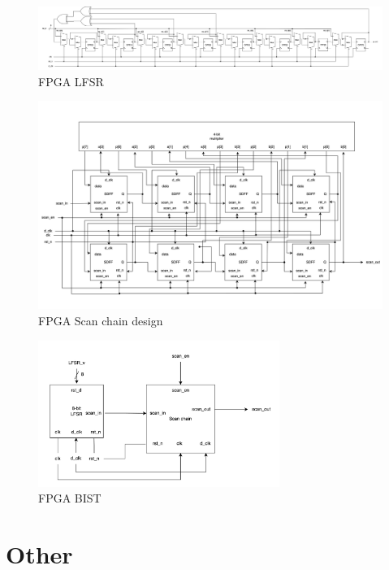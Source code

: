 \documentclass[10.5pt,compsoc,UTF8]{CjC}
\theoremstyle{mystyle}
\begin{document}
\begin{figure}[h!]
  \centering
  \includegraphics[width=\textwidth]{./img/FPGA-LFSR.png}
  \caption{FPGA LFSR}
  \label{fig:Q4-LFSR}
\end{figure}

\newpage

\begin{figure}[h!]
  \centering
  \includegraphics[width=\textwidth]{./img/FPGA-SCD.png}
  \caption{FPGA Scan chain design}
  \label{fig:Q4-SCD}
\end{figure}

\begin{figure}[h!]
  \centering
  \includegraphics[width=0.7\textwidth]{./img/FPGA-BIST.png}
  \caption{FPGA BIST}
  \label{fig:Q4-BIST}
\end{figure}

\section{Other}
\end{document}

